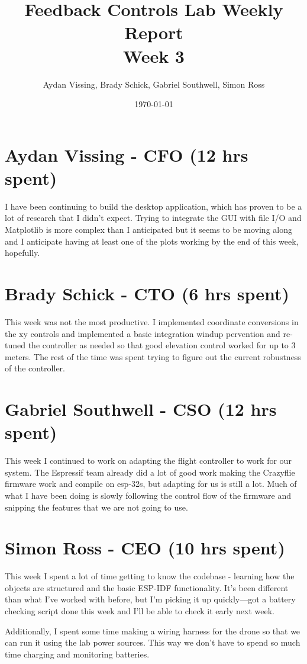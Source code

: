\documentclass[12pt, titlepage]{article}
\title{Feedback Controls Lab Weekly Report \\ \normalsize{Week 3}}
\author{Aydan Vissing, Brady Schick, Gabriel Southwell, Simon Ross}
\date{\today}
\begin{document}
\maketitle

\section*{Aydan Vissing - CFO (12 hrs spent)}

I have been continuing to build the desktop application, which has proven to be a lot of research that I didn't expect. Trying to integrate the GUI with file I/O and Matplotlib is more complex than I anticipated but it seems to be moving along and I anticipate having at least one of the plots working by the end of this week, hopefully. 

\section*{Brady Schick - CTO (6 hrs spent)}

This week was not the most productive. I implemented coordinate conversions in the xy controls and implemented a basic integration windup pervention and re-tuned the controller as needed so that good elevation control worked for up to 3 meters. The rest of the time was spent trying to figure out the current robustness of the controller.

\section*{Gabriel Southwell - CSO (12 hrs spent)}

This week I continued to work on adapting the flight controller to work for our system. The Espressif team already did a lot of good work making the Crazyflie firmware work and compile on esp-32s, but adapting for us is still a lot. Much of what I have been doing is slowly following the control flow of the firmware and snipping the features that we are not going to use.

\section*{Simon Ross - CEO (10 hrs spent)}

This week I spent a lot of time getting to know the codebase - learning how the objects are structured and the basic ESP-IDF functionality. It's been different than what I've worked with before, but I'm picking it up quickly---got a battery checking script done this week and I'll be able to check it early next week. 

Additionally, I spent some time making a wiring harness for the drone so that we can run it using the lab power sources. This way we don't have to spend so much time charging and monitoring batteries.
\end{document}
